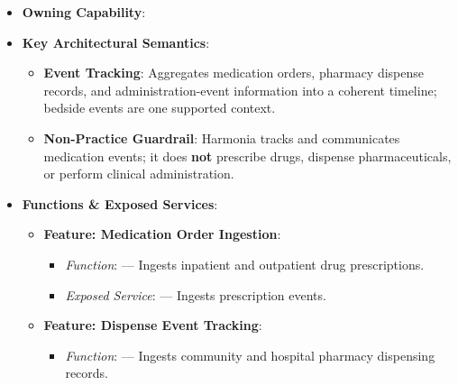 \begin{itemize}

\item
\textbf{Owning Capability}: \texttt{}



\item
\textbf{Key Architectural Semantics}:


\begin{itemize}

\item
\textbf{Event Tracking}: Aggregates medication orders, pharmacy dispense records, and administration-event information into a coherent timeline; bedside events are one supported context.



\item
\textbf{Non-Practice Guardrail}: Harmonia tracks and communicates medication events; it does \textbf{not} prescribe drugs, dispense pharmaceuticals, or perform clinical administration.



\end{itemize}


\item
\textbf{Functions \& Exposed Services}:


\begin{itemize}

\item
\textbf{Feature: Medication Order Ingestion}:


\begin{itemize}

\item
\emph{Function}: \texttt{} — Ingests inpatient and outpatient drug prescriptions.



\item
\emph{Exposed Service}: \texttt{} — Ingests prescription events.



\end{itemize}


\item
\textbf{Feature: Dispense Event Tracking}:


\begin{itemize}

\item
\emph{Function}: \texttt{} — Ingests community and hospital pharmacy dispensing records.




\end{itemize}
\end{itemize}
\end{itemize}
